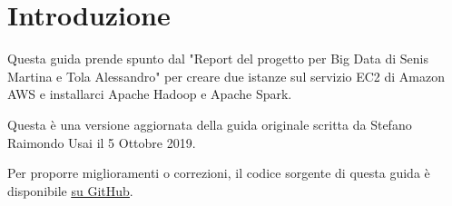\section{Introduzione}

Questa guida prende spunto dal "Report del progetto per Big Data di Senis Martina e Tola Alessandro" per creare due istanze sul servizio EC2 di Amazon AWS e installarci Apache Hadoop e Apache Spark.

Questa è una versione aggiornata della guida originale scritta da Stefano Raimondo Usai il 5 Ottobre 2019.

Per proporre miglioramenti o correzioni, il codice sorgente di questa guida è disponibile \underline{\href{https://github.com/costantin0/big-data-aws-guide}{su GitHub}}.
